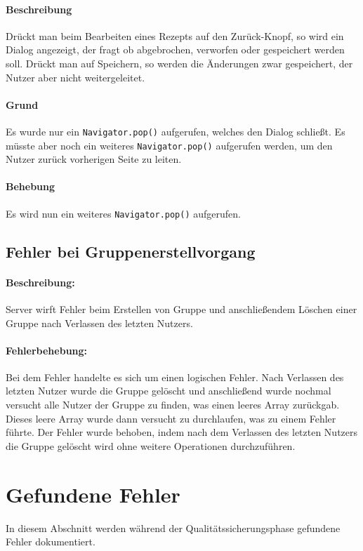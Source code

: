 \documentclass{qualitätssicherungsheft}
\begin{document}
\paragraph*{Beschreibung} Drückt man beim Bearbeiten eines Rezepts auf den Zurück-Knopf, so wird ein Dialog angezeigt, der fragt ob abgebrochen, verworfen oder gespeichert werden soll. Drückt man auf Speichern, so werden die Änderungen zwar gespeichert, der Nutzer aber nicht weitergeleitet.
\paragraph{Grund} Es wurde nur ein \texttt{Navigator.pop()} aufgerufen, welches den Dialog schließt. Es müsste aber noch ein weiteres \texttt{Navigator.pop()} aufgerufen werden, um den Nutzer zurück vorherigen Seite zu leiten.
\paragraph{Behebung} Es wird nun ein weiteres \texttt{Navigator.pop()} aufgerufen.
\newpage
\subsection{Fehler bei Gruppenerstellvorgang}
\paragraph*{Beschreibung:} Server wirft Fehler beim Erstellen von Gruppe und anschließendem Löschen einer Gruppe nach Verlassen des letzten Nutzers.
\paragraph*{Fehlerbehebung:} Bei dem Fehler handelte es sich um einen logischen Fehler. Nach Verlassen des letzten Nutzer wurde die Gruppe gelöscht und anschließend wurde nochmal versucht alle Nutzer der Gruppe zu finden, was einen leeres Array zurückgab. Dieses leere Array wurde dann versucht zu durchlaufen, was zu einem Fehler führte. Der Fehler wurde behoben, indem nach dem Verlassen des letzten Nutzers die Gruppe gelöscht wird ohne weitere Operationen durchzuführen.
\newpage

\section{Gefundene Fehler}
In diesem Abschnitt werden während der Qualitätssicherungsphase gefundene Fehler dokumentiert.
\end{document}
